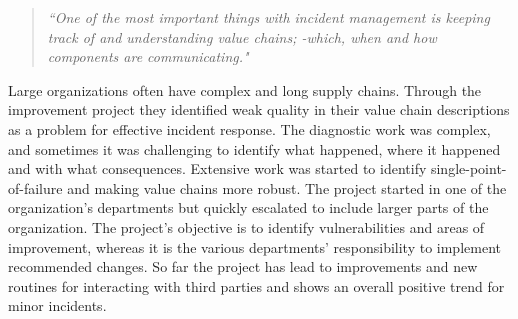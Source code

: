 \begin{quote}
\textit{``One of the most important things with incident management is keeping track of and understanding value chains; -which, when and how components are communicating."}
\end{quote}

Large organizations often have complex and long supply chains. Through the improvement project they identified weak quality in their value chain descriptions as a problem for effective incident response. The diagnostic work was complex, and sometimes it was challenging to identify what happened, where it happened and with what consequences. Extensive work was started to identify single-point-of-failure and making value chains more robust. The project started in one of the organization's departments but quickly escalated to include larger parts of the organization. The project's objective is to identify vulnerabilities and areas of improvement, whereas it is the various departments' responsibility to implement recommended changes. So far the project has lead to improvements and new routines for interacting with third parties and shows an overall positive trend for minor incidents. 